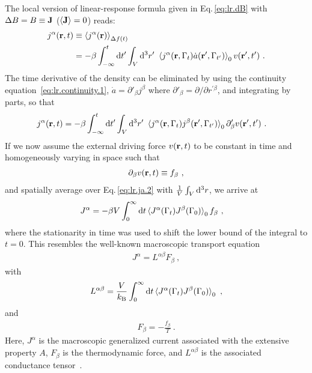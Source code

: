 The local version of linear-response formula given in Eq.\,\eqref{eq:lr.dB} with \mbox{$\Delta B = B \equiv {\bf J}$} ($\braket{{\bf J}} = 0$) reads:
\begin{align}
j^\alpha ({\bf r} , t) 
	& \equiv \braket{j^\alpha ({\bf r})}_{\Delta f (t)} \\
	&= - \beta \int_{-\infty}^{t} {\rm d} t' \int_V {\rm d}^3 r' ~ \braket{
			j^\alpha ({\bf r}, \Gamma_t) \dot{a} ({\bf r}', \Gamma_{t'})
		}_0 v ({\bf r}', t')~.
	\label{eq:lr.ja.1}
\end{align}
The time derivative of the density can be eliminated by using the continuity equation~\eqref{eq:lr.continuity.1}, $\dot a = \partial'_\beta j^\beta$ where $\partial'_\beta = \partial/\partial r^{\prime \beta}$, and integrating by parts, so that
\begin{align}
j^\alpha ({\bf r} , t) 
&= - \beta \int_{-\infty}^{t} {\rm d} t' \int_V {\rm d}^3 r' ~ \braket{
	j^\alpha ({\bf r}, \Gamma_t) j^\beta ({\bf r}', \Gamma_{t'})
}_0 \partial'_\beta v ({\bf r}', t')~.
\label{eq:lr.ja.2}
\end{align}
If we now assume the external driving force $v ({\bf r}, t)$ to be constant in time and homogeneously varying in space such that
\begin{align}
	\partial_\beta v ({\bf r}, t) \equiv f_\beta~,
	\label{eq:lr.force}
\end{align}
and spatially average over Eq.\,\eqref{eq:lr.ja.2} with $\frac{1}{V} \int_V {\rm d}^3 r$, we arrive at
\begin{align}
	J^\alpha 
		&= -\beta V \int_{0}^{\infty} 
		{\rm d} t
		\braket{
		J^\alpha (\Gamma_t) J^\beta (\Gamma_{0})
	}_0 
	f_\beta~,
	\label{eq:lr.J}
\end{align}
where the stationarity in time was used to shift the lower bound of the integral to $t=0$.
This resembles the well-known macroscopic transport equation
\begin{align}
	J^\alpha =  L^{\alpha \beta} F_\beta~,
		\label{eq:lr.LF}
\end{align}
with
\begin{align}
	L^{\alpha \beta}
		= \frac{V}{k_{\rm B}} \int_{0}^{\infty} 
		{\rm d} t \braket{J^\alpha (\Gamma_t) J^\beta (\Gamma_{0})}_0 ~,
	\label{eq:lr.L}
\end{align}
and
\begin{align}
	F_\beta
		= - \frac{f_\beta}{T}~.
	\label{eq:lr.F}
\end{align}
Here, $J^\alpha$ is the macroscopic generalized current associated with the extensive property $A$, $F_\beta$ is the thermodynamic force, and $L^{\alpha \beta}$ is the associated conductance tensor~\cite{Onsager1931a,Baroni2020a}.


